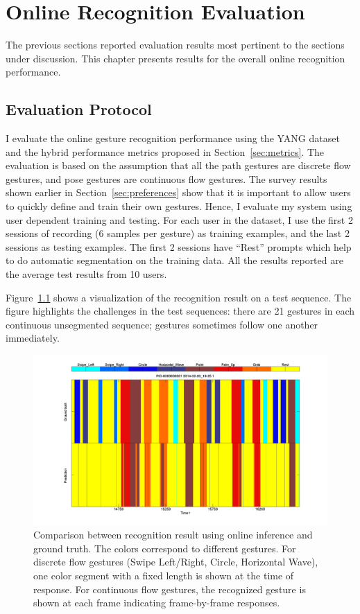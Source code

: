 \chapter{Online Recognition Evaluation}\label{sec:evaluation}
The previous sections reported evaluation results most pertinent
to the sections under discussion. This chapter presents results
for the overall online recognition performance.

\section{Evaluation Protocol}
I evaluate the online gesture recognition performance using the YANG
dataset and the hybrid performance
metrics proposed in Section~\ref{sec:metrics}. The evaluation is based on the
assumption that all the path gestures are
discrete flow gestures, and pose gestures are continuous flow
gestures.
The survey results shown earlier in Section~\ref{sec:preferences} show that it
is important to allow users to quickly define and train their own gestures. Hence,
I evaluate my system using user dependent training and testing. For each user
in the dataset, I use the first 2 sessions of recording (6 samples per gesture)
as training examples, and the last 2 sessions as testing examples. The first 2
sessions have ``Rest'' prompts which help to do automatic segmentation on the
training data. All the results reported are the average test results from 10
users.

Figure~\ref{fig:recog-result} shows a visualization of the recognition result on
a test sequence. The figure highlights the challenges in the test sequences:
there are 21 gestures in each continuous unsegmented sequence; 
gestures sometimes follow one another immediately.

\begin{figure}[thb]
\centering
\includegraphics[trim=43mm 15mm 42mm 10mm, clip,
width=\columnwidth]{figures/recog_result.png}
\caption{Comparison between recognition result using online inference
and ground truth.
The colors correspond to different gestures. For discrete flow gestures
(Swipe Left/Right, Circle, Horizontal Wave), one color segment with a fixed
length is shown at the time of response. For continuous flow gestures, the
recognized gesture is shown at each frame indicating frame-by-frame responses.}
\label{fig:recog-result}
\end{figure}

